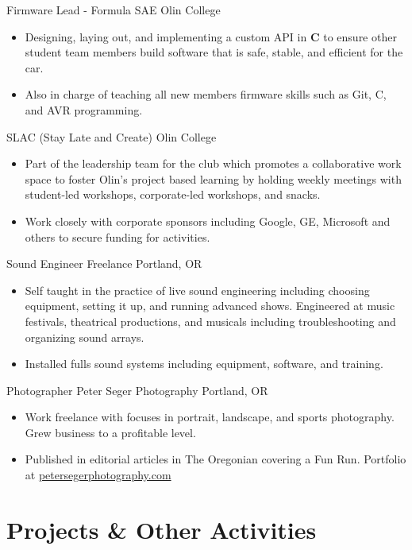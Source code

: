 \documentclass[11 pt]{moderncv}
\begin{document}
{Firmware Lead - Formula SAE}
{Olin College}
{}
{}
{
\begin{itemize}
	\item Designing, laying out, and implementing a custom API in \textbf{C} to ensure other student team members build software that is safe, stable, and efficient for the car. 
	\item Also in charge of teaching all new members firmware skills such as Git, C, and AVR programming.
\end{itemize}
}

{SLAC (Stay Late and Create)}
{Olin College}
{}
{}
{
\begin{itemize}
	\item Part of the leadership team for the club which promotes a collaborative work space to foster Olin's project based learning by holding weekly meetings with student-led workshops, corporate-led workshops, and snacks. 
	\item Work closely with corporate sponsors including Google, GE, Microsoft and others to secure funding for activities. 
\end{itemize}
}

{Sound Engineer}
{Freelance}
{Portland, OR}
{}
{
\begin{itemize}
	\item Self taught in the practice of live sound engineering including choosing equipment, setting it up, and running advanced shows. Engineered at music festivals, theatrical productions, and musicals including troubleshooting and organizing sound arrays. 
	\item Installed fulls sound systems including equipment, software, and training.
\end{itemize}
}

{Photographer}
{Peter Seger Photography}
{Portland, OR}
{}
{
\begin{itemize}
	\item Work freelance with focuses in portrait, landscape, and sports photography. Grew business to a profitable level.
	\item Published in editorial articles in The Oregonian covering a Fun Run. Portfolio at \href{www.petersegerphotography.com}{petersegerphotography.com}
\end{itemize}
}


\vspace{0.08 in}
\section{Projects \& Other Activities}
\vspace{0.1 in}
\end{document}
